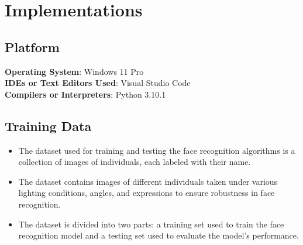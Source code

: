 \documentclass[openany]{report}
\begin{document}
\section{Implementations}

\subsection{Platform}
\textbf{Operating System}: Windows 11 Pro\\
\textbf{IDEs or Text Editors Used}: Visual Studio Code\\
\textbf{Compilers or Interpreters}: Python 3.10.1\\

\subsection{Training Data}
\begin{itemize}
    \item The dataset used for training and testing the face recognition algorithms is a collection of images of individuals, each labeled with their name.
    \item The dataset contains images of different individuals taken under various lighting conditions, angles, and expressions to ensure robustness in face recognition.
    \item The dataset is divided into two parts: a training set used to train the face recognition model and a testing set used to evaluate the model's performance.
\end{itemize}
\end{document}
